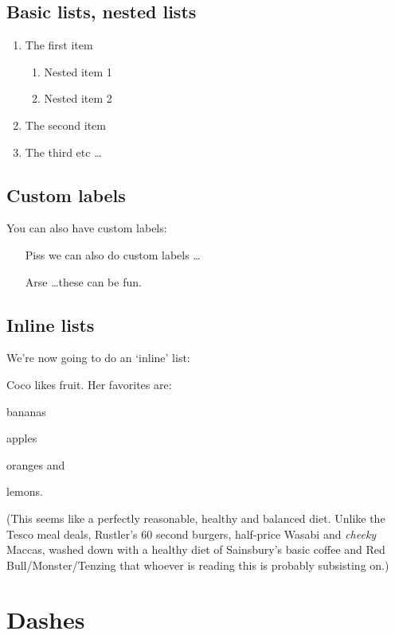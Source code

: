 \documentclass[../main]{subfiles}
\begin{document}
\subsection{Basic lists, nested lists}
\begin{enumerate}
\item The first item
\begin{enumerate}
\item Nested item 1
\item Nested item 2
\end{enumerate}
\item The second item
\item The third etc \ldots
\end{enumerate}

\subsection{Custom labels}
You can also have custom labels:
\begin{enumerate}
\item [Piss] we can also do custom labels \dots
\item [Arse] \dots these can be fun.
\end{enumerate}

\subsection{Inline lists}
We're now going to do an `inline' list:

Coco likes fruit. Her favorites are:
\begin{enumerate*}[label={\alph*)},font={\bfseries}]
\item bananas
\item apples
\item oranges and
\item lemons.
\end{enumerate*}

(This seems like a perfectly reasonable, healthy and balanced diet. Unlike the Tesco meal deals, Rustler's 60 second burgers, half-price Wasabi and \emph{cheeky} Maccas, washed down with a healthy diet of Sainsbury's basic coffee and Red Bull/Monster/Tenzing that whoever is reading this is probably subsisting on.)

\section{Dashes}
\end{document}

